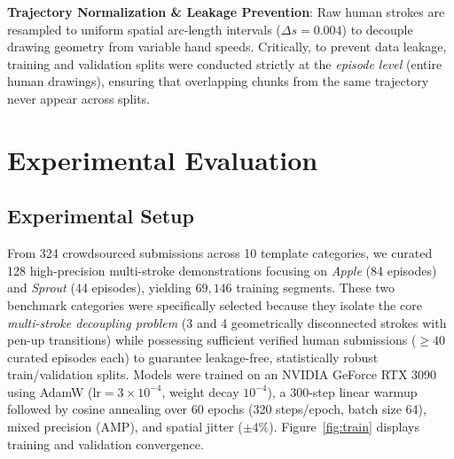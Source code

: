 \documentclass[10pt,twocolumn,letterpaper]{article}
\begin{document}
\noindent\textbf{Trajectory Normalization \& Leakage Prevention}: Raw human strokes are resampled to uniform spatial arc-length intervals ($\Delta s = 0.004$) to decouple drawing geometry from variable hand speeds. Critically, to prevent data leakage, training and validation splits were conducted strictly at the \emph{episode level} (entire human drawings), ensuring that overlapping chunks from the same trajectory never appear across splits.

\section{Experimental Evaluation}

\subsection{Experimental Setup}
From 324 crowdsourced submissions across 10 template categories, we curated 128 high-precision multi-stroke demonstrations focusing on \emph{Apple} (84 episodes) and \emph{Sprout} (44 episodes), yielding $69,146$ training segments. These two benchmark categories were specifically selected because they isolate the core \emph{multi-stroke decoupling problem} (3 and 4 geometrically disconnected strokes with pen-up transitions) while possessing sufficient verified human submissions ($\ge 40$ curated episodes each) to guarantee leakage-free, statistically robust train/validation splits. Models were trained on an NVIDIA GeForce RTX 3090 using AdamW ($\text{lr} = 3\times 10^{-4}$, weight decay $10^{-4}$), a 300-step linear warmup followed by cosine annealing over 60 epochs (320 steps/epoch, batch size 64), mixed precision (AMP), and spatial jitter ($\pm 4\%$). Figure~\ref{fig:train} displays training and validation convergence.
\end{document}
